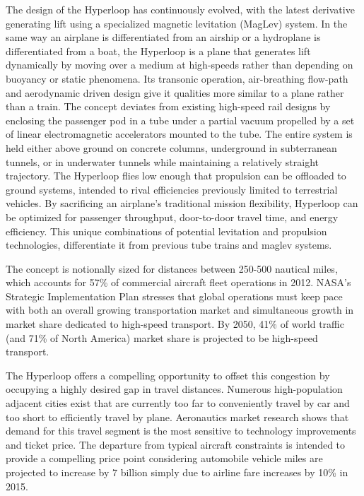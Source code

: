 	The design of the Hyperloop has continuously evolved, with the latest derivative
	generating lift using a specialized magnetic levitation (MagLev) system.
	In the same way an airplane is differentiated from an airship or a hydroplane is differentiated from
	a boat, the Hyperloop is a plane that generates lift dynamically
	by moving over a medium at high-speeds
	rather than depending on buoyancy or static phenomena.
	Its transonic operation, air-breathing flow-path and aerodynamic
	driven design give it qualities more similar to a plane rather than a train.
	The concept deviates from existing high-speed rail designs by enclosing the passenger pod in a tube under a partial vacuum
	propelled by a set of linear electromagnetic accelerators
	mounted to the tube. The entire system is held either above ground on concrete
	columns, underground in subterranean tunnels, or in underwater tunnels while maintaining a relatively straight trajectory.
	The Hyperloop flies low enough that propulsion can be offloaded to ground systems,
	intended to rival efficiencies previously limited to terrestrial vehicles.
	By sacrificing an airplane's traditional mission flexibility,
	Hyperloop can be optimized for passenger throughput, door-to-door travel time,
	and energy efficiency.
	This unique combinations of potential levitation and propulsion technologies,
	differentiate it from previous tube trains and maglev systems.

	The concept is notionally sized for distances between 250-500 nautical miles,
	which accounts for 57\% of commercial aircraft fleet operations in 2012. NASA's
	Strategic Implementation Plan stresses that global operations must keep pace with both an overall growing
	transportation market and simultaneous growth in market share dedicated to high-speed transport.
	By 2050, 41\% of world traffic (and 71\% of North America) market share is
	projected to be high-speed transport. \cite{Schafer}

	The Hyperloop offers a compelling opportunity to offset this congestion
	by occupying a highly desired gap in travel distances.
	Numerous high-population adjacent cities exist that are currently
	too far to conveniently travel by car and too short to efficiently travel by plane.
	Aeronautics market research shows that demand for this travel segment is
	the most sensitive to technology improvements and ticket price.\cite{Baik}
	The departure from typical aircraft constraints is intended to provide a
	compelling price point considering automobile vehicle miles are
	projected to increase by 7 billion simply due to airline
	fare increases by 10\% in 2015.

